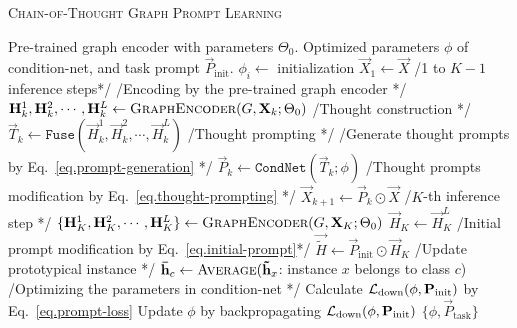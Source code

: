 \begin{algorithm}[tbp]
\small
\caption{\textsc{Chain-of-Thought Graph Prompt Learning}}
\label{alg.prompt}
\begin{algorithmic}[1]
    \Require Pre-trained graph encoder with parameters $\Theta_0$.
    \Ensure Optimized parameters $\phi$ of condition-net, and task prompt $\vec{P}_{\text{init}}$.
        \State $\phi_i \leftarrow$ initialization
        \State $\vec{X}_1\leftarrow \vec{X}$
        \State \slash* 1 to $K-1$ inference steps*\slash
            \State \slash* Encoding by the pre-trained graph encoder *\slash
            \State $\vec{H}_k^1, \vec{H}_k^2, \cdots, \vec{H}_k^L \leftarrow \textsc{GraphEncoder}(G,\vec{X}_k;\Theta_0)$
            \State \slash* Thought construction *\slash
            \State $\vec{T}_{k} \leftarrow \mathtt{Fuse}(\vec{H}_k^1, \vec{H}_k^2, \cdots, \vec{H}_k^L)$
            \State \slash* Thought prompting *\slash
            \State \slash*  Generate thought prompts by Eq.~\ref{eq.prompt-generation} *\slash
            \State $\vec{P}_{k} \leftarrow \mathtt{CondNet}(\vec{T}_{k}; \phi)$
            \State \slash* Thought prompts modification by Eq.~\ref{eq.thought-prompting} *\slash
            \State $\vec{X}_{k+1} \leftarrow \vec{P}_{k} \odot \vec{X}$
        \EndWhile
            \State \slash* $K$-th inference step *\slash
            \State $\{\vec{H}_K^1, \vec{H}_K^2, \cdots, \vec{H}_K^L\} \leftarrow \textsc{GraphEncoder}(G,\vec{X}_K;\Theta_0)$
            \State $\vec{H}_{K}\leftarrow \vec{H}_K^L$
            \State \slash* Initial prompt modification by Eq.~\ref{eq.initial-prompt}*\slash
            \State $\vec{\tilde{H}} \leftarrow \vec{P}_\text{init} \odot \vec{H}_{K}$
            \State \slash* Update prototypical instance *\slash
                \State ${\vec{\bar{h}}}_{c} \leftarrow \textsc{Average}(\vec{\tilde{h}}_{x}$: instance $x$ belongs to class $c$)
            \EndFor
            \State \slash* Optimizing the parameters in condition-net *\slash
            \State Calculate $\bL_\text{down}(\phi,\vec{P}_\text{init})$ by Eq.~\eqref{eq.prompt-loss}
            \State Update $\phi$ by backpropagating  $\bL_\text{down}(\phi,\vec{P}_\text{init})$
        \EndWhile    
    \State \Return $\{\phi,\vec{P}_\text{task}\}$
\end{algorithmic}
\end{algorithm}

